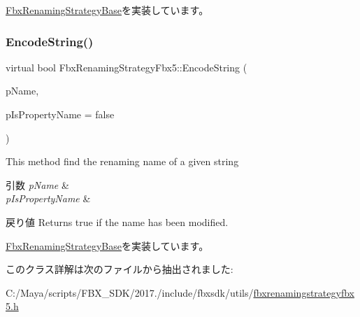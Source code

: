 \hyperlink{class_fbx_renaming_strategy_base_a7449fa6c649949d6d5e3c4b7190d6b25}{Fbx\+Renaming\+Strategy\+Base}を実装しています。

\mbox{\label{class_fbx_renaming_strategy_fbx5_adcd74ccce2269d962b5bd8e8600c472c}} 
\subsubsection{\texorpdfstring{Encode\+String()}{EncodeString()}}
{\footnotesize\ttfamily virtual bool Fbx\+Renaming\+Strategy\+Fbx5\+::\+Encode\+String (\begin{DoxyParamCaption}\item[{\hyperlink{class_fbx_name_handler}{Fbx\+Name\+Handler} \&}]{p\+Name,  }\item[{bool}]{p\+Is\+Property\+Name = {\ttfamily false} }\end{DoxyParamCaption})\hspace{0.3cm}{\ttfamily [virtual]}}

This method find the renaming name of a given string 
\begin{DoxyParams}{引数}
{\em p\+Name} & \\
\hline
{\em p\+Is\+Property\+Name} & \\
\hline
\end{DoxyParams}
\begin{DoxyReturn}{戻り値}
Returns true if the name has been modified. 
\end{DoxyReturn}


\hyperlink{class_fbx_renaming_strategy_base_aa762726a9d92a328ec720f2b8135db09}{Fbx\+Renaming\+Strategy\+Base}を実装しています。



このクラス詳解は次のファイルから抽出されました\+:\begin{DoxyCompactItemize}
\item 
C\+:/\+Maya/scripts/\+F\+B\+X\+\_\+\+S\+D\+K/2017./include/fbxsdk/utils/\hyperlink{fbxrenamingstrategyfbx5_8h}{fbxrenamingstrategyfbx5.\+h}\end{DoxyCompactItemize}
